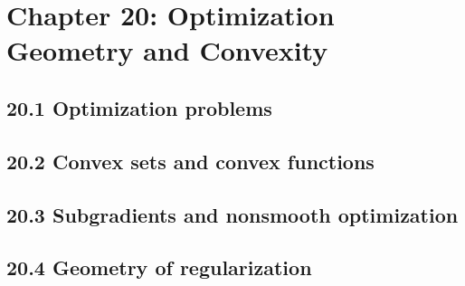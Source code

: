 \section{Chapter 20: Optimization Geometry and Convexity}

\subsection{20.1 Optimization problems}

\subsection{20.2 Convex sets and convex functions}

\subsection{20.3 Subgradients and nonsmooth optimization}

\subsection{20.4 Geometry of regularization}

\clearpage
